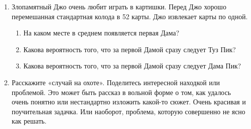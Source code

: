 \documentclass[12pt]{article}
\begin{document}
\begin{enumerate}
\item Злопамятный Джо очень любит играть в картишки. Перед Джо хорошо перемешанная
стандартная колода в 52 карты. Джо извлекает карты по одной.

\begin{enumerate}
\item На каком месте в среднем появляется первая Дама?
\item Какова вероятность того, что за первой Дамой сразу следует Туз Пик?
\item Какова вероятность того, что за первой Дамой сразу следует Дама Пик?
\end{enumerate}

  \item Расскажите «случай на охоте». Поделитесь интересной находкой или проблемой.
  Это может быть рассказ в вольной форме о том, как удалось очень понятно
  или нестандартно изложить какой-то сюжет. Очень красивая и поучительная задачка.
  Или наоборот, проблема, которую совершенно не ясно как решать.



\end{enumerate}
\end{document}
